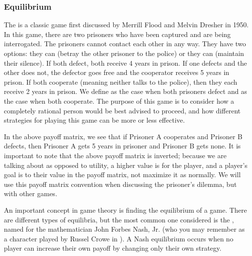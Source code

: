 \documentclass[letterpaper,10pt,english]{jupyterBook}
\begin{document}
\subsubsection{Equilibrium}
\label{\detokenize{content/07-game-theory/equilibria-oligopolies:equilibrium}}
\sphinxAtStartPar
The  is a classic game first discussed by Merrill Flood and Melvin Dresher in 1950. In this game, there are two prisoners who have been captured and are being interrogated. The prisoners cannot contact each other in any way. They have two options: they can  (betray the other prisoner to the police) or they can  (maintain their silence). If both defect, both receive 4 years in prison. If one defects and the other does not, the defector goes free and the cooperator receives 5 years in prison. If both cooperate (meaning neither talks to the police), then they each receive 2 years in prison. We define  as the case when both prisoners defect and  as the case when both cooperate. The purpose of this game is to consider how a completely rational person would be best advised to proceed, and how different strategies for playing this game can be more or less effective.







\sphinxAtStartPar
In the above payoff matrix, we see that if Prisoner A cooperates and Prisoner B defects, then Prisoner A gets 5 years in prisoner and Prisoner B gets none. It is important to note that the above payoff matrix is inverted; because we are talking about  as opposed to utility, a higher value is  for the player, and a player’s goal is to  their value in the payoff matrix, not maximize it as normally. We will use this payoff matrix convention when discussing the prisoner’s dilemma, but  with other games.

\sphinxAtStartPar
An important concept in game theory is finding the equilibrium of a game. There are different types of equilibria, but the most common one considered is the , named for the mathematician John Forbes Nash, Jr. (who you may remember as a character played by Russel Crowe in ). A Nash equilibrium occurs when no player can increase their own payoff by changing only their own strategy.
\end{document}
